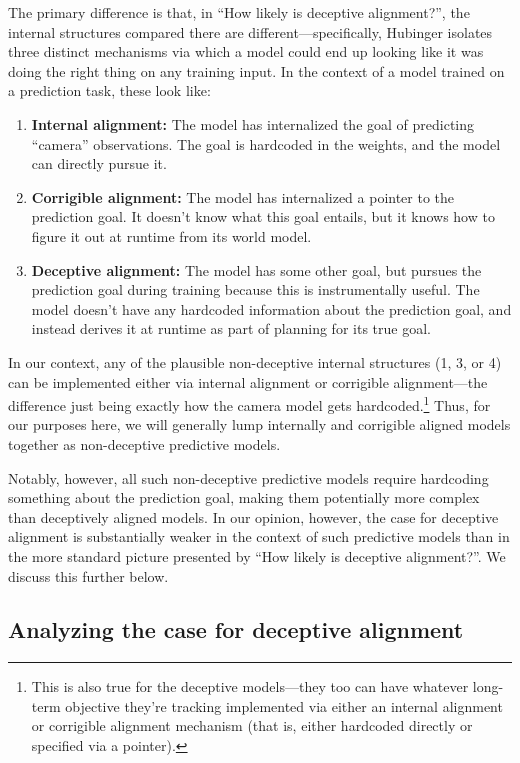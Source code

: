\documentclass[
  onecolumn,
  natbib,
]{miri-tech-article}
\begin{document}
The primary difference is that, in ``How likely is deceptive alignment?'', the internal structures compared there are different---specifically, Hubinger isolates three distinct mechanisms via which a model could end up looking like it was doing the right thing on any training input. In the context of a model trained on a prediction task, these look like:



\begin{enumerate}
\item \textbf{Internal alignment:} The model has internalized the goal of predicting ``camera'' observations. The goal is hardcoded in the weights, and the model can directly pursue it.
\item \textbf{Corrigible alignment:} The model has internalized a pointer to the prediction goal. It doesn't know what this goal entails, but it knows how to figure it out at runtime from its world model.
\item \textbf{Deceptive alignment:} The model has some other goal, but pursues the prediction goal during training because this is instrumentally useful. The model doesn't have any hardcoded information about the prediction goal, and instead derives it at runtime as part of planning for its true goal.
\end{enumerate}

In our context, any of the plausible non-deceptive internal structures (1, 3, or 4) can be implemented either via internal alignment or corrigible alignment---the difference just being exactly how the camera model gets hardcoded.\footnote{This is also true for the deceptive models---they too can have whatever long-term objective they're tracking implemented via either an internal alignment or corrigible alignment mechanism (that is, either hardcoded directly or specified via a pointer).} Thus, for our purposes here, we will generally lump internally and corrigible aligned models together as non-deceptive predictive models.

Notably, however, all such non-deceptive predictive models require hardcoding something about the prediction goal, making them potentially more complex than deceptively aligned models. In our opinion, however, the case for deceptive alignment is substantially weaker in the context of such predictive models than in the more standard picture presented by ``How likely is deceptive alignment?\cite{how_likely_deception}''. We discuss this further below.


\subsection{Analyzing the case for deceptive alignment}
\end{document}
